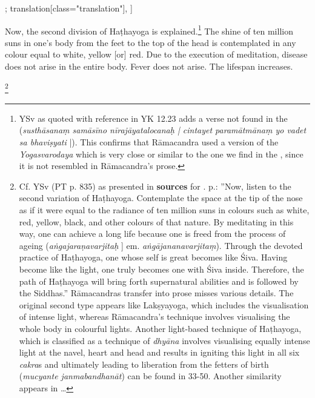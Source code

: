 \begin{alignment}[
  texts=edition[class="edition"];
  translation[class="translation"],
  ]
\begin{translation}
\label{secondhathatrans}
      \begin{tlate}[p20_01]
        \indent Now, the second division of Haṭhayoga is explained.\footnote{YSv as quoted with reference in YK 12.23 adds a verse not found in the  (\textit{susthāsanaṃ samāsīno nīrajāyatalocanaḥ | cintayet paramātmānaṃ yo vadet sa bhaviṣyati} |). This confirms that Rāmacandra used a version of the \textit{Yogasvarodaya} which is very close or similar to the one we find in the , since it is not resembled in Rāmacandra's prose.} The shine of ten million suns in one's body from the feet to the top of the head is contemplated in any colour equal to white, yellow [or] red. Due to the execution of meditation, disease does not arise in the entire body. Fever does not arise. The lifespan increases.\begin{buber}[f20_1]\footnote{Cf. YSv (PT p. 835) as presented in \textbf{sources} for . p.\pageref{hathayoga}: ''Now, listen to the second variation of Haṭhayoga. Contemplate the space at the tip of the nose as if it were equal to the radiance of ten million suns in colours such as white, red, yellow, black, and other colours of that nature. By meditating in this way, one can achieve a long life because one is freed from the process of ageing (\textit{aṅgajaraṇavarjitaḥ} ] em. \textit{aṅgājananavarjitaṃ}). Through the devoted practice of Haṭhayoga, one whose self is great becomes like Śiva. Having become like the light, one truly becomes one with Śiva inside. Therefore, the path of Haṭhayoga will bring forth supernatural abilities and is followed by the Siddhas.'' Rāmacandras transfer into prose misses various details. The original second type appears like Lakṣyayoga, which includes the visualisation of intense light, whereas Rāmacandra's technique involves visualising the whole body in colourful lights. Another light-based technique of Haṭhayoga, which is classified as a technique of \textit{dhyāna} involves visualising equally intense light at the navel, heart and head and results in igniting this light in all six \textit{cakra}s and ultimately leading to liberation from the fetters of birth (\textit{mucyante janmabandhanāt}) can be found in  33-50. Another similarity appears in \ldots}\end{buber}
        \flushpage 
        \end{tlate}
      \end{translation}
    \end{alignment}
    \pagebreak %
